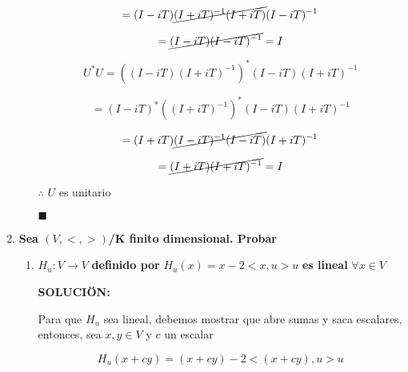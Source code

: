 \documentclass[12pt,a4paper]{article}
\begin{document}
\begin{enumerate}
\begin{enumerate}
        \begin{equation*}
            =(I-iT)\cancel{(I+iT)^{-1}(I+iT)}(I-iT)^{-1}
        \end{equation*}
        
        \begin{equation*}
            =\cancel{(I-iT)(I-iT)^{-1}}=I
        \end{equation*}
        
        \begin{equation*}
            U^{*}U=((I-iT)(I+iT)^{-1})^{*}(I-iT)(I+iT)^{-1}
        \end{equation*}
        
        \begin{equation*}
            =(I-iT)^*((I+iT)^{-1})^{*}(I-iT)(I+iT)^{-1}
        \end{equation*}
        
        \begin{equation*}
            =(I+iT)\cancel{(I-iT)^{-1}(I-iT)}(I+iT)^{-1}
        \end{equation*}
        
        \begin{equation*}
            =\cancel{(I+iT)(I+iT)^{-1}}=I
        \end{equation*}
        
        $\therefore$ $U$ es unitario 
        
        $\hspace{15cm}$  $\blacksquare$
        
         
    \end{enumerate}
    
    \item \textbf{Sea $(V,<,>)$/K  finito dimensional. Probar}
    
    \begin{enumerate}
        \item $H_u:V \rightarrow V$ \textbf{definido por} $H_u(x)=x-2<x,u>u$ \textbf{es lineal} $\forall x \in V$
        
        \textbf{SOLUCIÖN:}
        
        Para que $H_u$ sea lineal, debemos mostrar que abre sumas y saca escalares, entonces, sea $x,y \in  V$ y $c$ un escalar
        
        \begin{equation*}
            H_u(x+cy)=(x+cy)-2<(x+cy),u>u
        \end{equation*}
        

\end{enumerate}
\end{enumerate}
\end{document}
